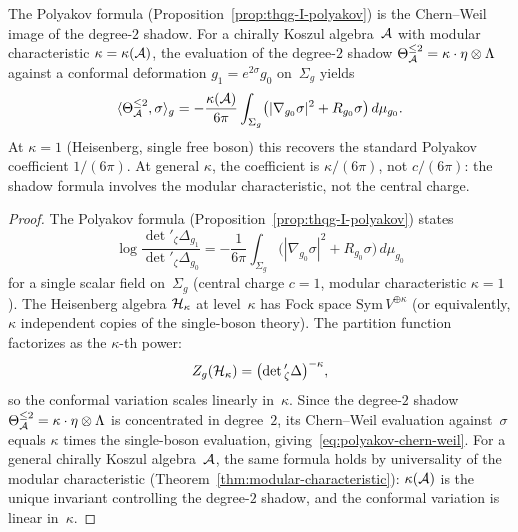 \begin{proposition}
\label{prop:polyakov-chern-weil}
The Polyakov formula (Proposition~\ref{prop:thqg-I-polyakov}) is the Chern--Weil image of the degree-$2$ shadow. For a chirally Koszul algebra~$\mathcal{A}$ with modular characteristic $\kappa = \kappa(\mathcal{A})$, the evaluation of the degree-$2$ shadow $\Theta_{\mathcal{A}}^{\leq 2} = \kappa \cdot \eta \otimes \Lambda$ against a conformal deformation $g_1 = e^{2\sigma}g_0$ on~$\Sigma_g$ yields
\begin{equation}\label{eq:polyakov-chern-weil}
\langle \Theta_{\mathcal{A}}^{\leq 2}, \sigma \rangle_{g} = -\frac{\kappa(\mathcal{A})}{6\pi}\int_{\Sigma_g}\bigl(|\nabla_{g_0}\sigma|^2 + R_{g_0}\sigma\bigr)\,d\mu_{g_0}.
\end{equation}
At $\kappa = 1$ (Heisenberg, single free boson) this recovers the standard Polyakov coefficient $1/(6\pi)$. At general $\kappa$, the coefficient is $\kappa/(6\pi)$, not $c/(6\pi)$: the shadow formula involves the modular characteristic, not the central charge.
\end{proposition}

\begin{proof}
The Polyakov formula (Proposition~\ref{prop:thqg-I-polyakov}) states
\[
\log\frac{\det{}'_\zeta\Delta_{g_1}}{\det{}'_\zeta\Delta_{g_0}}
= -\frac{1}{6\pi}\int_{\Sigma_g}\bigl(|\nabla_{g_0}\sigma|^2 + R_{g_0}\sigma\bigr)\,d\mu_{g_0}
\]
for a single scalar field on~$\Sigma_g$ (central charge $c = 1$, modular characteristic $\kappa = 1$). The Heisenberg algebra $\mathcal{H}_\kappa$ at level~$\kappa$ has Fock space $\mathrm{Sym}\,V^{\oplus \kappa}$ (or equivalently, $\kappa$ independent copies of the single-boson theory). The partition function factorizes as the $\kappa$-th power:
\[
Z_g(\mathcal{H}_\kappa) = \bigl(\det{}'_\zeta\Delta\bigr)^{-\kappa},
\]
so the conformal variation scales linearly in~$\kappa$. Since the degree-$2$ shadow $\Theta_{\mathcal{A}}^{\leq 2} = \kappa \cdot \eta \otimes \Lambda$ is concentrated in degree~$2$, its Chern--Weil evaluation against~$\sigma$ equals $\kappa$ times the single-boson evaluation, giving~\eqref{eq:polyakov-chern-weil}. For a general chirally Koszul algebra~$\mathcal{A}$, the same formula holds by universality of the modular characteristic (Theorem~\ref{thm:modular-characteristic}): $\kappa(\mathcal{A})$ is the unique invariant controlling the degree-$2$ shadow, and the conformal variation is linear in~$\kappa$.
\end{proof}

